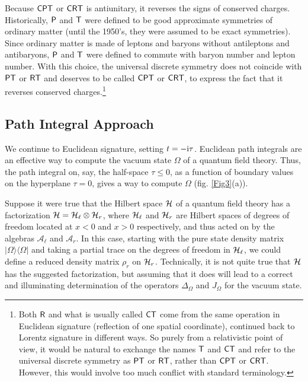 \documentclass[12pt]{article}
\def\CPT{\sf{CPT}}
\def\CRT{{\sf{CRT}}}
\def\ra{\rangle}
\def\la{\langle}
\def\RR{{\sf R}}
\numberwithin{equation}{section}
\def\A{{\mathcal A}}
\begin{document}
Because $\CPT$ or $\CRT$ is antiunitary, it reverses the signs of conserved charges.  
Historically, $\sf P$ and $\sf T$ were defined to be good approximate symmetries of ordinary matter
(until the 1950's, they were assumed to be exact symmetries).  Since ordinary matter is made of leptons and baryons without antileptons
and antibaryons, $\sf P$ and $\sf T$ were defined to commute with baryon number and lepton number.  With this choice, 
the universal discrete symmetry does not coincide with $\sf {PT}$ or $\sf{RT}$ and  deserves to be called $\CPT$ or $\CRT$, to express the fact that it reverses conserved
charges.\footnote{Both $\RR$ and what is usually called $\sf{CT}$ come from the same operation in Euclidean signature (reflection of 
one spatial coordinate), continued back to Lorentz signature in different ways.  So purely from a relativistic point of view, it would be natural to exchange the names $\sf T$ and $\sf{CT}$ and
refer to the universal  discrete symmetry as $\sf{PT}$ or $\sf{RT}$, rather than $\sf{CPT}$ or $\sf{CRT}$.  However, this would
involve too much conflict with standard terminology.} 

 

\subsection{Path Integral Approach}\label{pathint}

We continue to Euclidean signature, setting $t=-{\mathrm i} \tau$.   Euclidean path integrals are an effective way to compute
the vacuum state $\Omega$ of a quantum field theory.    Thus, the path integral on, say, the half-space $\tau\leq 0$,
as a function of boundary values on the hyperplane $\tau=0$, gives a way to compute $\Omega$ (fig. \ref{Fig3}(a)).

Suppose it were true that the Hilbert space ${\mathcal H}$ of a quantum field theory has a factorization ${\mathcal H}={\mathcal H}_\ell\otimes {\mathcal H}_r$, where ${\mathcal H}_\ell$
and ${\mathcal H}_r$ are Hilbert spaces of degrees of freedom located at $x<0$ and $x>0$ respectively, and thus acted on by the algebras
$\A_\ell$ and $\A_r$.    In this case, starting with the pure state density matrix $|\Omega\ra\la\Omega|$ and
 taking a partial trace on the degrees of freedom in ${\mathcal H}_\ell$, we could define a reduced density matrix
$\rho_r$ on ${\mathcal H}_r$.    Technically, it is not quite true that ${\mathcal H}$ has the suggested factorization, but assuming that it does
will lead to a correct and illuminating determination of the operators $\Delta_\Omega$ and $J_\Omega$ for the vacuum state.  
\end{document}
